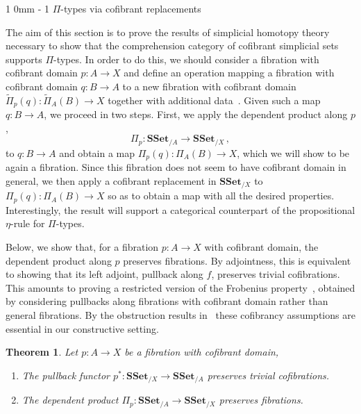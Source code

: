 \documentclass[reqno,10pt,a4paper,oneside,draft]{amsart}
\makeatletter
\renewcommand{\section}{\@startsection
{section}%
{1}%
{0mm}%
{-\baselineskip}%
{1\baselineskip}%
{\Large \bfseries}}%
\numberwithin{equation}{section}
\theoremstyle{mythm}
\newtheorem{theorem}{Theorem}[section]
\theoremstyle{mydef}
\theoremstyle{myrmk}
\newcommand{\ie}{\text{i.e.\ }}
\newcommand{\co}{\colon}
\newcommand{\SSet}{\mathbf{SSet}}
\makeatother
\begin{document}
\section{$\Pi$-types via cofibrant replacements}
\label{sec:Pi-types}

The aim of this section is to prove the results of simplicial homotopy theory necessary to show that
the comprehension category of cofibrant simplicial sets supports $\Pi$-types. 
In order to do this, we should consider a fibration with cofibrant domain $p \co A \to X$  and define an operation mapping a fibration with cofibrant domain $q \co B \to A$  to a new fibration with cofibrant domain~$\widetilde{\Pi}_p(q) \co \widetilde{\Pi}_A(B) \to X$ together with additional data~\cite{LumsdaineP:locuoc}. 
Given such a map $q \co B \to A$, we proceed
in two steps. First, we apply the dependent product along $p$, 
\[
\Pi_p \co \SSet_{/A} \to \SSet_{/X} \, , 
\]
to $q \co B \to A$ and obtain a map $\Pi_p(q) \co \Pi_A(B) \to X$, which we will show to be again a fibration. Since this fibration does not seem to have  cofibrant domain in general, we then apply a
cofibrant replacement in $\SSet_{/X}$ to $\Pi_p(q) \co \Pi_A(B) \to X$ so as to obtain a map with all the desired properties. Interestingly, the result will support a categorical counterpart of the propositional
$\eta$-rule for $\Pi$-types.

Below, we show that, for a fibration $p \co A \rightarrow X$ with cofibrant domain, the dependent product along $p$ preserves fibrations. By adjointness, this is equivalent to showing that its left adjoint, \ie 
 pullback along $f$, preserves trivial cofibrations. This amounts to proving a restricted version of the Frobenius property~\cite{BergB:topsmi}, obtained by considering pullbacks along fibrations with
cofibrant domain rather than general fibrations. By the obstruction results in~\cite{coquand-non-constructivity-kan}  these cofibrancy assumptions are essential in our constructive setting.  


\begin{theorem}\label{cor:Pi_types_are_fibrant}
Let $p \co A \rightarrow X$ be a fibration with cofibrant domain,
\begin{enumerate}[$(i)$]
\item The pullback functor $p^* \co \SSet_{/X} \to \SSet_{/A}$ preserves trivial cofibrations.
\item The dependent product $\Pi_p \co \SSet_{/A} \to \SSet_{/X}$ preserves  fibrations.
\end{enumerate}
\end{theorem}
\end{document}

